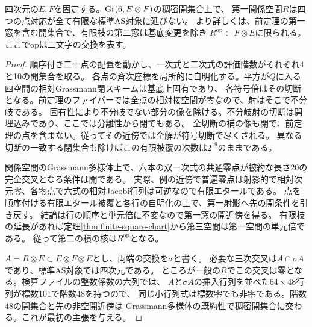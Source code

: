 \begin{theorem}[一般の第一窓に対する非延長]\label{thm:generic-finite-window-obstruction}
四次元の$E,F$を固定する。$\operatorname{Gr}(6,E\otimes F)$の稠密開集合上で、
第一関係空間$R$は四つの点対応が全て有限な標準AS対象に延びない。
より詳しくは、前定理の第一窓を含む開集合で、有限枝の第二窓は基底変更を除き
$R^{\mathrm{op}}\subset F\otimes E$に限られる。ここで$\mathrm{op}$は二文字の交換を表す。
\end{theorem}
\begin{proof}
順序付き二十点の配置を動かし、一次式と二次式の評価階数がそれぞれ4と10の開集合を取る。
各点の斉次座標を局所的に自明化する。平方が$Q$に入る四空間の相対Grassmann閉スキームは基底上固有であり、
各符号倍はその切断となる。前定理のファイバーでは全点の相対接空間が零なので、射はそこで不分岐である。
固有性により不分岐でない部分の像を除ける。不分岐射の切断は開埋込みであり、ここでは分離性から閉でもある。
全切断の補の像も閉で、前定理の点を含まない。従ってその近傍では全解が符号切断で尽くされる。
異なる切断の一致する閉集合も除けばこの有限被覆の次数は$2^{19}$のままである。

関係空間のGrassmann多様体上で、六本の双一次式の共通零点が被約な長さ20の完全交叉となる条件は開である。
実際、例の近傍で普遍零点は射影的で相対次元零、各零点で六式の相対Jacobi行列は可逆なので有限エタールである。
点を順序付ける有限エタール被覆と各行の自明化の上で、第一射影へ先の開条件を引き戻す。
結論は行の順序と単元倍に不変なので第一窓の開近傍を得る。
有限枝の延長があれば定理\ref{thm:finite-square-chart}から第三空間は第一空間の単元倍である。
従って第二の積の核は$R^{\mathrm{op}}$となる。

$A=R\otimes E\subset E\otimes F\otimes E$とし、両端の交換を$\sigma$と書く。
必要な三次交叉は$A\cap\sigma A$であり、標準AS対象では四次元である。
ところが一般の$R$でこの交叉は零となる。検算ファイルの整数係数の六列では、
$A$と$\sigma A$の挿入行列を並べた$64\times48$行列が標数101で階数48を持つので、
同じ小行列式は標数零でも非零である。階数48の開集合と先の非空開近傍は
Grassmann多様体の既約性で稠密開集合に交わる。これが最初の主張を与える。
\end{proof}

